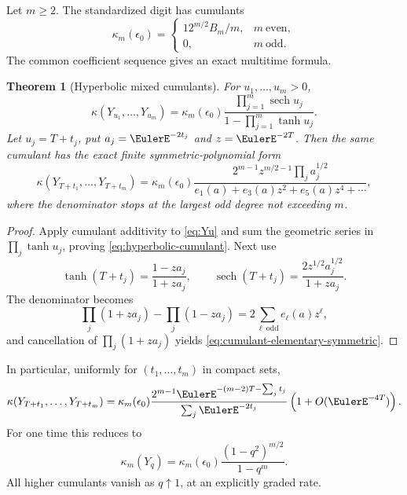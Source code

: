 \documentclass[11pt,a4paper]{article}
\newtheorem{theorem}{Theorem}[section]
\theoremstyle{definition}
\theoremstyle{remark}
\newcommand{\sech}{\operatorname{sech}}
\begin{document}
Let $m\ge2$.  The standardized digit has cumulants
\begin{equation}
  \kappa_m(\epsilon_0)=
  \begin{cases}
   12^{m/2}B_m/m,&m\ \text{even},\\
   0,&m\ \text{odd}.
  \end{cases}
  \label{eq:epsilon-cumulants}
\end{equation}
The common coefficient sequence gives an exact multitime formula.

\begin{theorem}[Hyperbolic mixed cumulants]
\label{thm:hyperbolic-cumulants}
For $u_1,\ldots,u_m>0$,
\begin{equation}
 \kappa(Y_{u_1},\ldots,Y_{u_m})
  =\kappa_m(\epsilon_0)
   \frac{\prod_{j=1}^m\sech u_j}
        {1-\prod_{j=1}^m\tanh u_j}.
 \label{eq:hyperbolic-cumulant}
\end{equation}
Let $u_j=T+t_j$, put $a_j=\EulerE^{-2t_j}$ and $z=\EulerE^{-2T}$.  Then the same cumulant has the exact finite symmetric-polynomial form
\begin{equation}
 \kappa(Y_{T+t_1},\ldots,Y_{T+t_m})
  =\kappa_m(\epsilon_0)
   \frac{2^{m-1}z^{m/2-1}\prod_ja_j^{1/2}}
   {e_1(a)+e_3(a)z^2+e_5(a)z^4+\cdots},
 \label{eq:cumulant-elementary-symmetric}
\end{equation}
where the denominator stops at the largest odd degree not exceeding $m$.
\end{theorem}

\begin{proof}
Apply cumulant additivity to \eqref{eq:Yu} and sum the geometric series in $\prod_j\tanh u_j$, proving \eqref{eq:hyperbolic-cumulant}.  Next use
\[
 \tanh(T+t_j)=\frac{1-za_j}{1+za_j},\qquad
 \sech(T+t_j)=\frac{2z^{1/2}a_j^{1/2}}{1+za_j}.
\]
The denominator becomes
\[
 \prod_j(1+za_j)-\prod_j(1-za_j)
  =2\sum_{\ell\ \mathrm{odd}}e_\ell(a)z^\ell,
\]
and cancellation of $\prod_j(1+za_j)$ yields \eqref{eq:cumulant-elementary-symmetric}.
\end{proof}

In particular, uniformly for $(t_1,\ldots,t_m)$ in compact sets,
\begin{equation}
 \kappa(Y_{T+t_1},\ldots,Y_{T+t_m})
  =\kappa_m(\epsilon_0)
   \frac{2^{m-1}\EulerE^{-(m-2)T-\sum_jt_j}}
        {\sum_j\EulerE^{-2t_j}}
    \left(1+O(\EulerE^{-4T})\right).
 \label{eq:cumulant-leading-asymptotic}
\end{equation}
For one time this reduces to
\begin{equation}
  \kappa_m(Y_q)
   =\kappa_m(\epsilon_0)
    \frac{(1-q^2)^{m/2}}{1-q^m}.
  \label{eq:Yq-cumulant}
\end{equation}
All higher cumulants vanish as $q\uparrow1$, at an explicitly graded rate.
\end{document}
